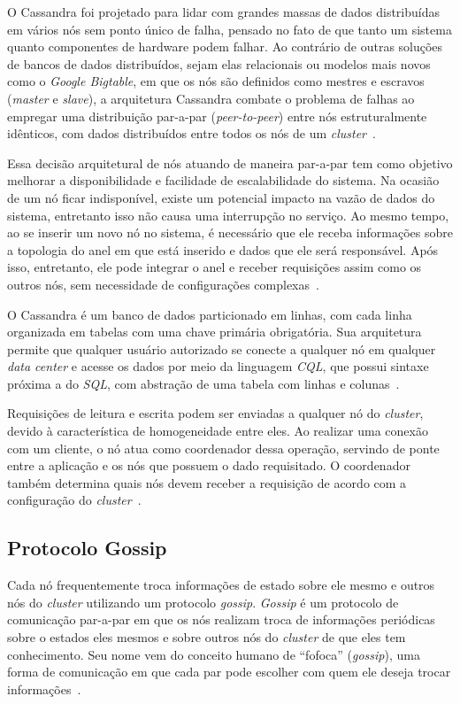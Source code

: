 O Cassandra foi projetado para lidar com grandes massas de dados distribuídas em vários nós sem ponto único de falha, pensado no fato de que tanto um sistema quanto componentes de hardware podem falhar.
Ao contrário de outras soluções de bancos de dados distribuídos, sejam elas relacionais ou modelos mais novos como o \emph{Google Bigtable}, em que os nós são definidos como mestres e escravos (\emph{master} e \emph{slave}), a arquitetura Cassandra combate o problema de falhas ao empregar uma distribuição par-a-par (\emph{peer-to-peer}) entre nós estruturalmente idênticos, com dados distribuídos entre todos os nós de um \emph{cluster}~\cite{cassandradocs, cassandraguide}.  

Essa decisão arquitetural de nós atuando de maneira par-a-par tem como objetivo melhorar a disponibilidade e facilidade de escalabilidade do sistema. Na ocasião de um nó ficar indisponível, existe um potencial impacto na vazão de dados do sistema, entretanto isso não causa uma interrupção no serviço. 
Ao mesmo tempo, ao se inserir um novo nó no sistema, é necessário que ele receba informações sobre a topologia do anel em que está inserido e dados que ele será responsável. Após isso, entretanto, ele pode integrar o anel e receber requisições assim como os outros nós, sem necessidade de configurações complexas~\cite{cassandraguide}.

O Cassandra é um banco de dados particionado em linhas, com cada linha organizada em tabelas com uma chave primária obrigatória. Sua arquitetura permite que qualquer usuário autorizado se conecte a qualquer nó em qualquer \emph{data center} e acesse os dados por meio da linguagem \emph{CQL}, que possui sintaxe próxima a do \emph{SQL}, com abstração de uma tabela com linhas e colunas~\cite{cassandradocs}. 

Requisições de leitura e escrita podem ser enviadas a qualquer nó do \emph{cluster}, devido à característica de homogeneidade entre eles. Ao realizar uma conexão com um cliente, o nó atua como coordenador dessa operação, servindo de ponte entre a aplicação e os nós que possuem o dado requisitado. O coordenador também determina quais nós devem receber a requisição de acordo com a configuração do \emph{cluster}~\cite{cassandradocs}. 

\subsection{Protocolo Gossip}

Cada nó frequentemente troca informações de estado sobre ele mesmo e outros nós do \emph{cluster} utilizando um  protocolo \emph{gossip}. \emph{Gossip} é um protocolo de comunicação par-a-par em que os nós realizam  troca de informações periódicas sobre o estados eles mesmos e sobre outros nós do \emph{cluster} de que eles tem conhecimento. Seu nome vem do conceito humano de \enquote{fofoca} (\emph{gossip}), uma forma de comunicação em que cada par pode escolher com quem ele deseja trocar informações~\cite{cassandradocs, cassandraguide}. 

